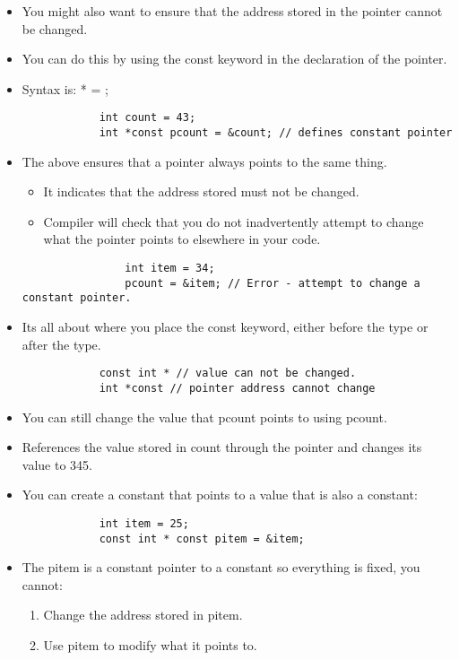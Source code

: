 \begin{itemize}
    \item You might also want to ensure that the address stored in the pointer cannot be changed. 
    \item You can do this by using the const keyword in the declaration of the pointer. 
    \item Syntax is:  *  = ; 

        \begin{verbatim}
            int count = 43; 
            int *const pcount = &count; // defines constant pointer
        \end{verbatim}

    
    \item The above ensures that a pointer always points to the same thing. 
        \begin{itemize}
            \item It indicates that the address stored must not be changed. 
            \item Compiler will check that you do not inadvertently attempt to change what the pointer points to elsewhere in your code.  
        \end{itemize}
            \begin{verbatim}
                int item = 34; 
                pcount = &item; // Error - attempt to change a constant pointer. 
            \end{verbatim}
    
    
    \item Its all about where you place the const keyword, either before the type or after the type. 
        \begin{verbatim}
            const int * // value can not be changed. 
            int *const // pointer address cannot change 
        \end{verbatim}
    
    \item You can still change the value that pcount points to using pcount.
    \item References the value stored in count through the pointer and changes its value to 345. 
    \item You can create a constant that points to a value that is also a constant: 
        \begin{verbatim}
            int item = 25; 
            const int * const pitem = &item;
        \end{verbatim}
    \item The pitem is a constant pointer to a constant so everything is fixed, you cannot:
        \begin{enumerate}
            \item Change the address stored in pitem. 
            \item Use pitem to modify what it points to. 
        \end{enumerate} 
    

\end{itemize}
